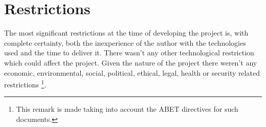 \section{Restrictions}
The most significant restrictions at the time of developing the project is, with complete certainty, both the inexperience of the author with the technologies used and the time to deliver it. There wasn't any other technological restriction which could affect the project. Given the nature of the project there weren't any economic, environmental, social, political, ethical, legal, health or security related restrictions \footnote{This remark is made taking into account the ABET directives for such documents.}.